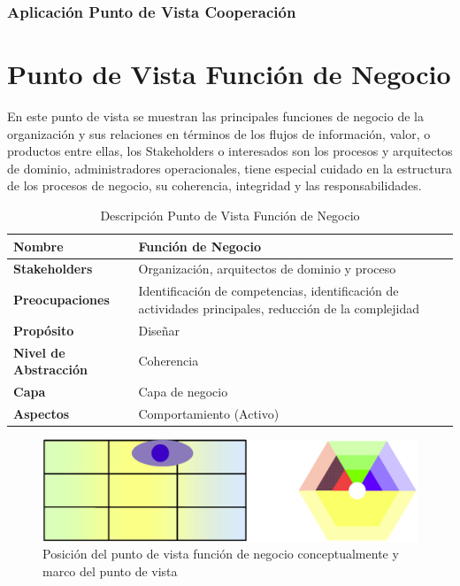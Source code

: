      \subsubsection{Aplicación Punto de Vista Cooperación}
      \section{Punto de Vista Función de Negocio}
      En este punto de vista se muestran las principales funciones de negocio de la organización y sus relaciones en términos de los flujos de información, valor, o productos entre ellas, los Stakeholders o interesados son los procesos y arquitectos de dominio, administradores operacionales, tiene especial cuidado en la estructura de los procesos de negocio, su coherencia, integridad y las responsabilidades. \cite{ref9}

      \begin{table}[h]
      	\centering
      	\begin{tabular}{p{3.7cm}p{8cm}}
      		\hline
      		\textbf{Nombre} & \textbf{Función de Negocio}\\
      		\hline
      		\textbf{Stakeholders} & Organización, arquitectos de dominio y proceso \\
      		\textbf{Preocupaciones} & Identificación de competencias, identificación de actividades principales, reducción de la complejidad \\
      		\textbf{Propósito} & Diseñar \\
      		\textbf{Nivel de Abstracción} & Coherencia \\
      		\textbf{Capa} & Capa de negocio \\
      		\textbf{Aspectos} & Comportamiento (Activo) \\
      	\end{tabular}
      	\caption{Descripción Punto de Vista Función de Negocio}
      	\label{Tab:tabla6}
      \end{table}

      \begin{figure}[h]
      	\centering
      	\includegraphics[scale=0.2]{Imagenes/Figuras/16.png}
      	\caption{Posición del punto de vista función de negocio conceptualmente y marco del punto de vista \cite{ref9}}
      	\label{figura16}
      \end{figure}

